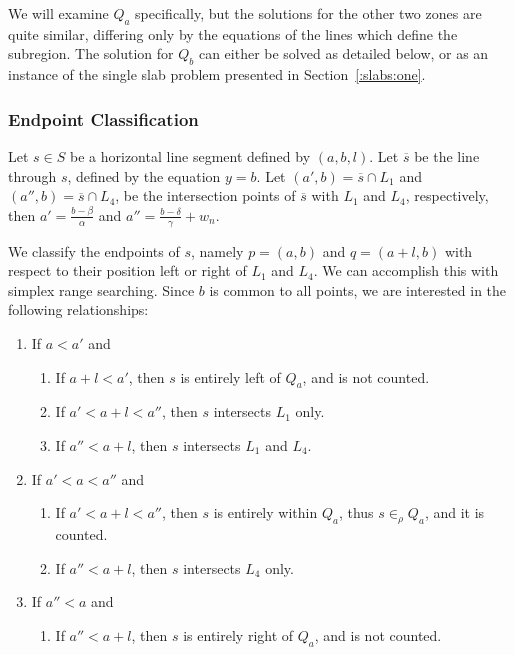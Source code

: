 We will examine $Q_a$ specifically, but the solutions for the other two zones are quite similar, differing only by the equations of the lines which define the subregion. 
The solution for $Q_b$ can either be solved as detailed below, or as an instance of the single slab problem presented in Section~\ref{:slabs:one}.


\subsubsection{Endpoint Classification}

Let $s \in S$ be a horizontal line segment defined by $(a, b, l)$.  Let $\overline{s}$ be the line through $s$, defined by the equation $y = b$.  Let $(a', b) = \overline{s} \cap L_1$ and $(a'', b) = \overline{s} \cap L_4$, be the intersection points of $\overline{s}$ with $L_1$ and $L_4$, respectively, then $a' = \frac{b - \beta}{\alpha}$ and $a'' = \frac{b - \delta}{\gamma} + w_n$.

We classify the endpoints of $s$, namely $p = (a, b)$ and $q = (a + l, b)$ with respect to their position left or right of $L_1$ and $L_4$. We can accomplish this with simplex range searching. Since $b$ is common to all points, we are interested in the following relationships:

\begin{enumerate}
 \item If $a < a'$ and

 \begin{enumerate}
  \item If $a + l < a'$, then $s$ is entirely left of $Q_a$, and is not counted.
  \item If $a' < a + l < a''$, then $s$ intersects $L_1$ only.
  \item If $a'' < a + l$, then $s$ intersects $L_1$ and $L_4$.
 \end{enumerate}

 \item If $a' < a < a''$ and
 \begin{enumerate}
  \item If $a' < a + l < a''$, then $s$ is entirely within $Q_a$, thus $s \in_\rho Q_a$, and it is counted.
  \item If $a'' < a + l$, then $s$ intersects $L_4$ only.
 \end{enumerate}

 \item If $a'' < a$ and
 \begin{enumerate}
  \item If $a'' < a + l$, then $s$ is entirely right of $Q_a$, and is not counted.
 \end{enumerate}
\end{enumerate}

